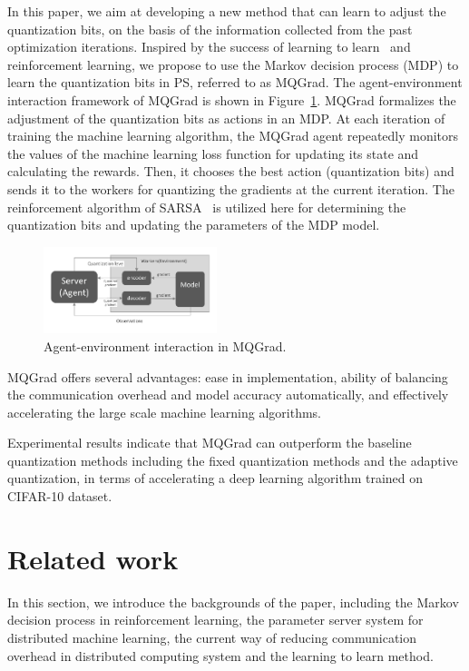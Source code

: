 \documentclass[sigconf]{acmart}
\begin{document}
In this paper, we aim at developing a new method that can learn to adjust the quantization bits, on the basis of the information collected from the past optimization iterations. Inspired by the success of learning to learn~\cite{andrychowicz2016learning} and reinforcement learning, we propose to use the Markov decision process (MDP) to learn the quantization bits in PS, referred to as MQGrad. The agent-environment interaction framework of MQGrad is shown in Figure~\ref{fig:simple_arch}. MQGrad formalizes the adjustment of the quantization bits as actions in an MDP. At each iteration of training the machine learning algorithm, the MQGrad agent repeatedly monitors the values of the machine learning loss function for updating its state and calculating the rewards. Then, it chooses the best action (quantization bits) and sends it to the workers for quantizing the gradients at the current iteration. The reinforcement algorithm of SARSA~\cite{sutton1998reinforcement} is utilized here for determining the quantization bits and updating the parameters of the MDP model.


\begin{figure}
	\includegraphics[width=0.45\textwidth]{simple_arch_v2.pdf}
	\caption{Agent-environment interaction in MQGrad.}\label{fig:simple_arch}
\end{figure}


MQGrad offers several advantages: ease in implementation, ability of balancing the communication overhead and model accuracy automatically, and effectively accelerating the large scale machine learning algorithms.

Experimental results indicate that MQGrad can outperform the baseline quantization methods including the fixed quantization methods and the adaptive quantization, in terms of accelerating a deep learning algorithm trained on CIFAR-10 dataset.


\section{Related work}\label{sec:RelatedWork}

In this section, we introduce the backgrounds of the paper, including the Markov decision process in reinforcement learning, the parameter server system for distributed machine learning, the current way of reducing communication overhead in distributed computing system and the learning to learn method.
\end{document}
